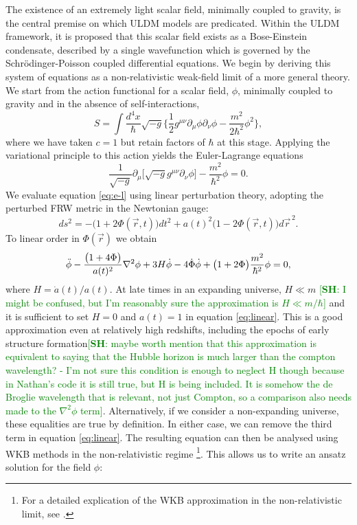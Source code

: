 \documentclass[a4paper,11pt]{article}
\newcommand{\sh}[1]{\textcolor{green}{[{\bf SH}: #1]}}
\begin{document}
The existence of an extremely light scalar field, minimally coupled to gravity, is the central premise on which ULDM models are predicated. Within the ULDM framework, it is proposed that this scalar field exists as a Bose-Einstein condensate, described by a single wavefunction which is governed by the Schr{\"o}dinger-Poisson coupled differential equations. We begin by deriving this system of equations as a non-relativistic weak-field limit of a more general theory. We start from the action functional for a scalar field, $\phi$, minimally coupled to gravity and in the absence of self-interactions,
%
\begin{equation}\label{eq:action}
    S=\int \frac{d^4x}{\hbar}\sqrt{-g}\bigg\{\frac{1}{2}g^{\mu\nu}\partial_\mu\phi\partial_\nu\phi-\frac{m^2}{2\hbar^2}\phi^2\bigg\},
\end{equation}
%
where we have taken $c=1$ but retain factors of $\hbar$ at this stage. Applying the variational principle to this action yields the Euler-Lagrange equations
%
\begin{equation}\label{eq:e-l}
    \frac{1}{\sqrt{-g}}\partial_\mu\big[\sqrt{-g}g^{\mu\nu}\partial_\nu\phi\big]-\frac{m^2}{\hbar^2}\phi=0.
\end{equation}
We evaluate equation \ref{eq:e-l} using linear perturbation theory, adopting the perturbed FRW metric in the Newtonian gauge:
\begin{equation}\label{eq:pFRW}
    ds^2=-\big(1+2\Phi(\vec{r},t)\big)dt^2+a(t)^2\big(1-2\Phi(\vec{r},t)\big)d\vec{r}^{\,2}.
\end{equation}
To linear order in $\Phi(\vec{r})$ we obtain 
\begin{equation}\label{eq:linear}
    \Ddot{\phi}-\frac{\big(1+4\Phi\big)}{a(t)^2}\nabla^2\phi+3H\Dot{\phi}-4\dot{\Phi}\dot{\phi}+\big(1+2\Phi\big)\frac{m^2}{\hbar^2}\phi=0,
\end{equation}
where $H=\Dot{a}(t)/a(t)$. At late times in an expanding universe, $H\ll m$ \sh{I might be confused, but I'm reasonably sure the approximation is $H\ll m/\hbar$} and it is sufficient to set $H=0$ and $a(t)=1$ in equation \ref{eq:linear}. This is a good approximation even at relatively high redshifts, including the epochs of early structure formation\sh{maybe worth mention that this approximation is equivalent to saying that the Hubble horizon is much larger than the compton wavelength? - I'm not sure this condition is enough to neglect H though because in Nathan's code it is still true, but H is being included. It is somehow the de Broglie wavelength that is relevant, not just Compton, so a comparison also needs made to the $\nabla^2 \phi$ term}. Alternatively, if we consider a non-expanding universe, these equalities are true by definition. In either case, we can remove the third term in equation \ref{eq:linear}. The resulting equation can then be analysed using WKB methods in the non-relativistic regime \footnote{For a detailed explication of the WKB approximation in the non-relativistic limit, see \cite{Young2015}.}. This allows us to write an ansatz solution for the field $\phi$:
\end{document}
